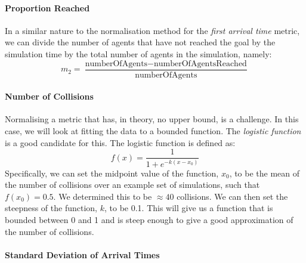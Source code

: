 \documentclass[12pt]{article}
\begin{document}
\paragraph{Proportion Reached}
In a similar nature to the normalisation method for the \emph{first arrival time} metric, we can divide the number of agents that have not reached the goal by the simulation time by the total number of agents in the simulation, namely:
\begin{equation}
    m_2 = \frac{\text{numberOfAgents} - \text{numberOfAgentsReached}}{\text{numberOfAgents}}
\end{equation}

\paragraph{Number of Collisions}
Normalising a metric that has, in theory, no upper bound, is a challenge. In this case, we will look at fitting the data to a bounded function. The \emph{logistic function} is a good candidate for this. The logistic function is defined as:
\begin{equation}
    f(x) = \frac{1}{1 + e^{-k(x-x_0)}}
\end{equation}
Specifically, we can set the midpoint value of the function, $x_0$, to be the mean of the number of collisions over an example set of simulations, such that $f(x_0) = 0.5$. We determined this to be $\approx 40$ collisions. We can then set the steepness of the function, $k$, to be 0.1. This will give us a function that is bounded between 0 and 1 and is steep enough to give a good approximation of the number of collisions.

\paragraph{Standard Deviation of Arrival Times}
\end{document}
